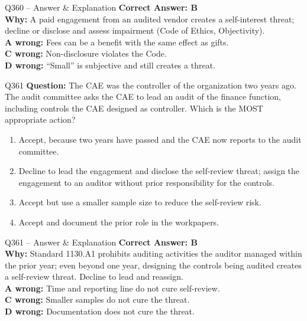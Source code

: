 \documentclass[aspectratio=169,10pt]{beamer}
\begin{document}
	\begin{frame}[t]{Q360 -- Answer \& Explanation}
		\small
		\textbf{Correct Answer: B} \\[4pt]
		\textbf{Why:} A paid engagement from an audited vendor creates a self-interest threat; decline or disclose and assess impairment (Code of Ethics, Objectivity). \\[4pt]
		\textbf{A wrong:} Fees can be a benefit with the same effect as gifts. \\[2pt]
		\textbf{C wrong:} Non-disclosure violates the Code. \\[2pt]
		\textbf{D wrong:} ``Small'' is subjective and still creates a threat.
	\end{frame}
	
	\begin{frame}[t]{Q361}
		\small
		\textbf{Question:} The CAE was the controller of the organization two years ago. The audit committee asks the CAE to lead an audit of the finance function, including controls the CAE designed as controller. Which is the MOST appropriate action?
		\begin{enumerate}[label=\Alph*.,itemsep=1pt,topsep=2pt]
			\item Accept, because two years have passed and the CAE now reports to the audit committee.
			\item Decline to lead the engagement and disclose the self-review threat; assign the engagement to an auditor without prior responsibility for the controls.
			\item Accept but use a smaller sample size to reduce the self-review risk.
			\item Accept and document the prior role in the workpapers.
		\end{enumerate}
	\end{frame}
	
	\begin{frame}[t]{Q361 -- Answer \& Explanation}
		\small
		\textbf{Correct Answer: B} \\[4pt]
		\textbf{Why:} Standard 1130.A1 prohibits auditing activities the auditor managed within the prior year; even beyond one year, designing the controls being audited creates a self-review threat. Decline to lead and reassign. \\[4pt]
		\textbf{A wrong:} Time and reporting line do not cure self-review. \\[2pt]
		\textbf{C wrong:} Smaller samples do not cure the threat. \\[2pt]
		\textbf{D wrong:} Documentation does not cure the threat.
	\end{frame}
	
\end{document}
